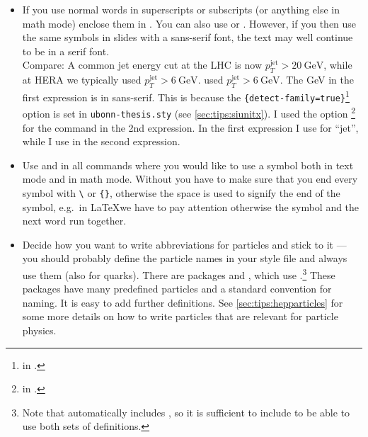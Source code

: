 \begin{itemize}
\item If you use normal words in superscripts or subscripts (or
  anything else in math mode) enclose them in . You can
  also use  or . However, if you then use
  the same symbols in slides with a sans-serif font, the text may well
  continue to be in a
  serif font.\\
  {\sffamily Compare: A common jet energy cut at the LHC is now
    \(p_{T}^{\text{jet}} > \SI{20}{\GeV}\), while at HERA we typically
     {%
      used \(p_{T}^{\mathrm{jet}} > \SI[obeyfamily=false]{6}{\GeV}\).
    }{%
      used \(p_{T}^{\mathrm{jet}} > \SI[detect-family=false]{6}{\GeV}\).
    }}
  The \si{\GeV} in the first expression is in sans-serif. This is
  because the
  \texttt{\{detect-family=true\}}\footnote{
    in .} option is set in \texttt{ubonn-thesis.sty}
  (see \cref{sec:tips:siunitx}).  I used the option
  \footnote{ in .} for the  command in the 2nd expression.
  In the first expression I use  for \enquote{jet}, while
  I use  in the second expression.

\item Use  and
   in all commands where you would
  like to use a symbol both in text mode and in math mode. Without
   you have to make sure that you end every symbol with
  \texttt{\textbackslash} or \texttt{\{\}}, otherwise the space is used
  to signify the end of the symbol, e.g.\ in \LaTeX we have to pay
  attention otherwise the symbol and the next word run together.

\item Decide how you want to write abbreviations for particles and
  stick to it --- you should probably define the particle names in your
  style file and always use them (also for quarks).
  There are packages  and ,
  which use .\footnote{%
    Note that  automatically includes ,
    so it is sufficient to include  to be able to use both sets of definitions.}
  These packages have many predefined particles and a standard convention for naming.
  It is easy to add further definitions.
  See \cref{sec:tips:hepparticles} for some more details on how to write particles
  that are relevant for particle physics.


\end{itemize}
